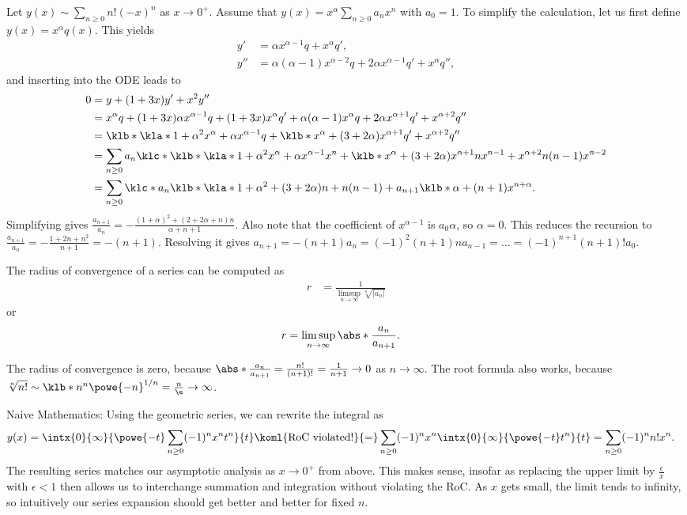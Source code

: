 \documentclass[english, parskip=full]{scrartcl}
\newcommand{\definition}[2]{\begin{tcolorbox}[colback=colorbackgrounddefinition,colframe=colordefinition, breakable,enhanced,title=\textbf{#1}.]#2\end{tcolorbox}}
\begin{document}
Let $y(x) \sim \sum_{n\ge 0} n! (-x)^n$ as $x\rightarrow 0^+$.
Assume that $y(x) = x^\alpha \sum_{n\ge 0} a_n x^n$ with $a_0=1$.
To simplify the calculation, let us first define $y(x) = x^\alpha q(x)$.
This yields
\begin{align}
y' &= \alpha x^{\alpha-1} q + x^\alpha q',\\
y'' &= \alpha (\alpha-1) x^{\alpha-2} q + 2\alpha x^{\alpha-1} q' + x^\alpha q'',
\end{align}
and inserting into the ODE leads to
\begin{align}
0 &= y + (1+3x)y'+x^2y''\\
&= x^\alpha q + (1+3x) \alpha x^{\alpha-1} q + (1+3x) x^\alpha q' + \alpha (\alpha-1)x^\alpha q + 2\alpha x^{\alpha+1} q' + x^{\alpha+2} q''\\
&= \klb*{\kla*{1+\alpha}^2 x^\alpha + \alpha x^{\alpha-1}}q + \klb*{x^\alpha + (3+2\alpha) x^{\alpha+1}}q' + x^{\alpha+2} q'' \\
&= \sum_{n\ge 0} a_n \klc*{\klb*{\kla*{1+\alpha}^2 x^\alpha + \alpha x^{\alpha-1}} x^n + \klb*{x^\alpha + (3+2\alpha) x^{\alpha+1}}nx^{n-1} + x^{\alpha+2} n(n-1)x^{n-2}}\\
&= \sum_{n\ge 0} \klc*{ a_n\klb*{\kla*{1+\alpha}^2 + (3+2\alpha)n + n(n-1)} + a_{n+1} \klb*{\alpha + (n+1)} }x^{n+\alpha}.
\end{align}
Simplifying gives $\frac{a_{n+1}}{a_n} = -\frac{(1+\alpha)^2 + (2 + 2\alpha  + n)n}{\alpha + n + 1}$.
Also note that the coefficient of $x^{\alpha-1}$ is $a_0\alpha$, so $\alpha=0$.
This reduces the recursion to $\frac{a_{n+1}}{a_n} = - \frac{1 + 2n + n^2}{n+1} = -(n+1)$.
Resolving it gives $a_{n+1} = -(n+1)a_n = (-1)^2 (n+1)na_{n-1} = \dots = (-1)^{n+1} (n+1)! a_0$.
\definition{Radius of Convergence (RoC)}{
The radius of convergence of a series can be computed as
\begin{align}
r &= \frac{1}{\limsup_{n\rightarrow \infty} \sqrt[n]{|a_n|}}
\end{align}
or
\begin{align}
r &= \limsup_{n\rightarrow \infty} \abs*{\frac{a_n}{a_{n+1}}}.
\end{align}
}
The radius of convergence is zero, because $\abs*{\frac{a_n}{a_{n+1}}} = \frac{n!}{(n+1)!} = \frac{1}{n+1}\rightarrow 0$ as $n\rightarrow\infty$.
The root formula also works, because $\sqrt[n]{n!} \sim \klb*{n^n \powe{-n}}^{1/n} = \frac{n}{\e} \rightarrow\infty$.

Naive Mathematics: Using the geometric series, we can rewrite the integral as
\begin{align}
y(x) &= \intx{0}{\infty}{ \powe{-t} \sum_{n\ge 0} (-1)^n x^n t^n}{t} \koml{\text{RoC violated!}}{=} \sum_{n\ge 0} (-1)^n x^n \intx{0}{\infty}{\powe{-t} t^n}{t} = \sum_{n\ge 0} (-1)^n n! x^n.
\end{align}
The resulting series matches our asymptotic analysis as $x\rightarrow 0^+$ from above.
This makes sense, insofar as replacing the upper limit by $\frac{\epsilon}{x}$ with $\epsilon < 1$ then allows us to interchange summation and integration without violating the RoC.
As $x$ gets small, the limit tends to infinity, so intuitively our series expansion should get better and better for fixed $n$.
\end{document}
